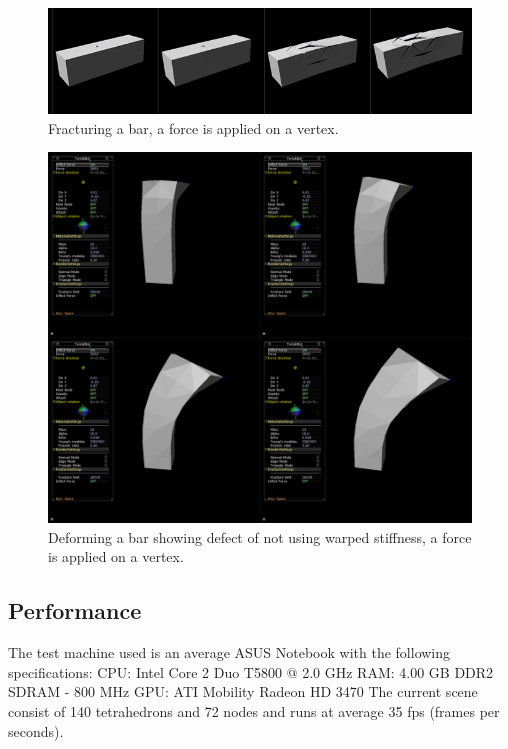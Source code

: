 \documentclass[10pt,a4paper]{article}
\begin{document}
\begin{figure}[htpb]
\centering
\includegraphics[width=\columnwidth]{figures/deffrac.png}
\caption{Fracturing a bar, a force is applied on a vertex.}
\label{fig:defSerie3}
\end{figure}

\begin{figure}[htpb]
\centering
\includegraphics[width=\columnwidth]{figures/defwarp.png}
\caption{Deforming a bar showing defect of not using warped stiffness, a force is applied on a vertex.}
\label{fig:defSerie4}
\end{figure}

\subsection{Performance}
The test machine used is an average ASUS Notebook with the following specifications:
\newline
\newline
CPU: Intel Core 2 Duo T5800 @ 2.0 GHz\newline
RAM: 4.00 GB DDR2 SDRAM - 800 MHz\newline
GPU: ATI Mobility Radeon HD 3470
\newline
\newline
The current scene consist of 140 tetrahedrons and 72 nodes and runs at average 35 fps (frames per seconds).
\end{document}
